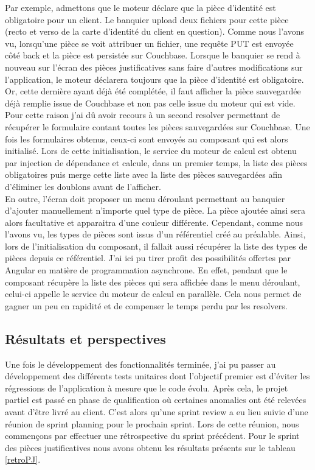 	Par exemple, admettons que le moteur déclare que la pièce d'identité est obligatoire pour un client. Le banquier upload deux fichiers pour cette pièce (recto et verso de la carte d'identité du client en question). Comme nous l'avons vu, lorsqu'une pièce se voit attribuer un fichier, une requête PUT est envoyée côté back et la pièce est persistée sur Couchbase. Lorsque le banquier se rend à nouveau sur l'écran des pièces justificatives sans faire d'autres modifications sur l'application, le moteur déclarera toujours que la pièce d'identité est obligatoire. Or, cette dernière ayant déjà été complétée, il faut afficher la pièce sauvegardée déjà remplie issue de Couchbase et non pas celle issue du moteur qui est vide. \\
	
	Pour cette raison j'ai dû avoir recours à un second resolver permettant de récupérer le formulaire contant toutes les pièces sauvegardées sur Couchbase. Une fois les formulaires obtenus, ceux-ci sont envoyés au composant qui est alors initialisé. Lors de cette initialisation, le service du moteur de calcul est obtenu par injection de dépendance et calcule, dans un premier temps, la liste des pièces obligatoires puis merge cette liste avec la liste des pièces sauvegardées afin d'éliminer les doublons avant de l'afficher. \\
	
	En outre, l'écran doit proposer un menu déroulant permettant au banquier d'ajouter manuellement n'importe quel type de pièce. La pièce ajoutée ainsi sera alors facultative et apparaitra d'une couleur différente. Cependant, comme nous l'avons vu, les types de pièces sont issus d'un référentiel créé au préalable. Ainsi, lors de l'initialisation du composant, il fallait aussi récupérer la liste des types de pièces depuis ce référentiel. J'ai ici pu tirer profit des possibilités offertes par Angular en matière de programmation asynchrone. En effet, pendant que le composant récupère la liste des pièces qui sera affichée dans le menu déroulant, celui-ci appelle le service du moteur de calcul en parallèle. Cela nous permet de gagner un peu en rapidité et de compenser le temps perdu par les resolvers.

\subsection{Résultats et perspectives}

	Une fois le développement des fonctionnalités terminée, j'ai pu passer au développement des différents tests unitaires dont l'objectif premier est d'éviter les régressions de l'application à mesure que le code évolu. Après cela, le projet partiel est passé en phase de qualification où certaines anomalies ont été relevées avant d'être livré au client. C'est alors qu'une sprint review a eu lieu suivie d'une réunion de sprint planning pour le prochain sprint. Lors de cette réunion, nous commençons par effectuer une rétrospective du sprint précédent. Pour le sprint des pièces justificatives nous avons obtenu les résultats présents sur le tableau \ref{retroPJ}.

